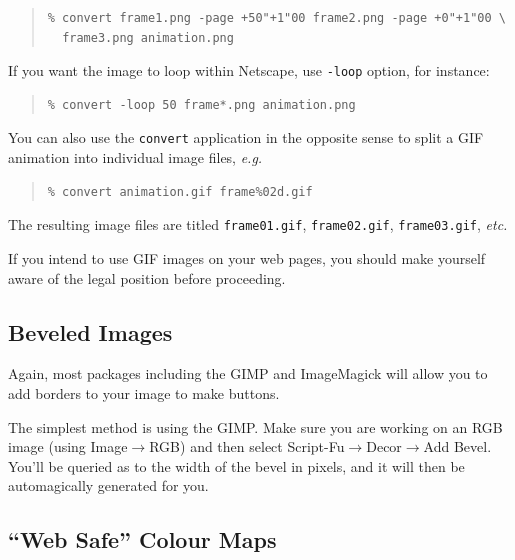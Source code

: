 \documentclass[twoside,11pt]{article}
\newcommand{\htmlref}[2]{#1}
\newcommand{\xlabel}[1]{}
\begin{document}
\small
\begin{quote}
\begin{verbatim}
% convert frame1.png -page +50"+1"00 frame2.png -page +0"+1"00 \
  frame3.png animation.png
\end{verbatim}
\end{quote}
\normalsize

If you want the image to loop within Netscape, use {\tt -loop} option, for instance: 

\small
\begin{quote}
\begin{verbatim}
% convert -loop 50 frame*.png animation.png
\end{verbatim}
\end{quote}
\normalsize

You can also use the {\tt convert} application in the opposite sense to split a GIF animation into individual image files, {\em e.g.\ }

\small
\begin{quote}
\begin{verbatim}
% convert animation.gif frame%02d.gif
\end{verbatim}
\end{quote}
\normalsize

The resulting image files are titled {\tt frame01.gif}, {\tt frame02.gif}, {\tt frame03.gif}, {\em etc.} 

If you intend to use GIF images on your web pages, you should make yourself aware of the \htmlref{legal position}{sc15_giflegal} before proceeding.
  
\subsection{\xlabel{sc15_bevel}Beveled Images\label{sc15_bevel}}
        
Again, most packages including the \htmlref{GIMP}{sc15_gimp} and \htmlref{ImageMagick}{sc15_magick} will allow you to add borders to your image to make buttons.

The simplest method is using the GIMP. Make sure you are working on an RGB image (using {\sc Image}$\rightarrow${RGB}) and then select {\sc Script-Fu}$\rightarrow${\sc Decor}$\rightarrow${\sc Add Bevel}. You'll be queried as to the width of the bevel in pixels, and it will then be automagically generated for you.    
  
\subsection{\xlabel{sc15_websafe}``Web Safe'' Colour Maps\label{sc15_websafe}}
\end{document}
